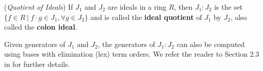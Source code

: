 \begin{Definition}
\label{def:quo}
({\it Quotient of Ideals}) If $J_1$ and $J_2$ are ideals in a ring $R$,
then $J_1:J_2$ is the set 
  $\{f \in R \ |\ f\cdot g \in J_1, \forall g \in J_2\}$ %
and is called the {\bf ideal quotient} of $J_1$ by $J_2$, also called
the {\bf colon ideal}.
\end{Definition}

Given generators of $J_1$ and $J_2$, the generators of $J_1:J_2$ can
also be computed using \Grobner bases with elimination (lex) term
orders. We refer the reader to Section 2.3 in \cite{ideals:book} for
further details. 





